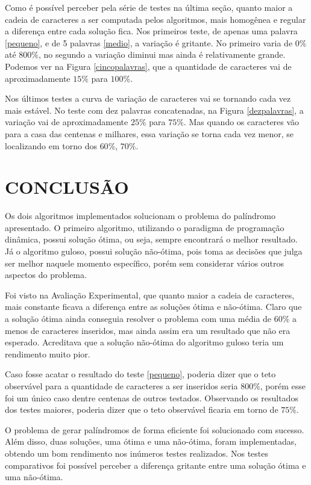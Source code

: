 \documentclass[12pt]{article}
\begin{document}
	Como é possível perceber pela série de testes na última seção, quanto maior a cadeia de caracteres a ser computada pelos algoritmos, mais homogênea e regular a diferença entre cada solução fica. Nos primeiros teste, de apenas uma palavra \ref{pequeno}, e de 5 palavras \ref{medio}, a variação é gritante. No primeiro varia de $0\%$ até $800\%$, no segundo a variação diminui mas ainda é relativamente grande. Podemos ver na Figura \ref{cincopalavras}, que a quantidade de caracteres vai de aproximadamente $15\%$ para $100\%$.

	Nos últimos testes a curva de variação de caracteres vai se tornando cada vez mais estável. No teste com dez palavras concatenadas, na Figura \ref{dezpalavras}, a variação vai de aproximadamente $25\%$ para $75\%$. Mas quando os caracteres vão para a casa das centenas e milhares, essa variação se torna cada vez menor, se localizando em torno dos $60\%$, $70\%$.


\section{CONCLUSÃO}
\label{conclusao}

    Os dois algoritmos implementados solucionam o problema do palíndromo apresentado. O primeiro algoritmo, utilizando o paradigma de programação dinâmica, possui solução ótima, ou seja, sempre encontrará o melhor resultado. Já o algoritmo guloso, possui solução não-ótima, pois toma as decisões que julga ser melhor naquele momento específico, porém sem considerar vários outros aspectos do problema.

    Foi visto na Avaliação Experimental, que quanto maior a cadeia de caracteres, mais constante ficava a diferença entre as soluções ótima e não-ótima. Claro que a solução ótima ainda conseguia resolver o problema com uma média de $60\%$ a menos de caracteres inseridos, mas ainda assim era um resultado que não era esperado. Acreditava que a solução não-ótima do algoritmo guloso teria um rendimento muito pior.

    Caso fosse acatar o resultado do teste \ref{pequeno}, poderia dizer que o teto observável para a quantidade de caracteres a ser inseridos seria $800\%$, porém esse foi um único caso dentre centenas de outros testados. Observando os resultados dos testes maiores, poderia dizer que o teto observável ficaria em torno de $75\%$.

    O problema de gerar palíndromos de forma eficiente foi solucionado com sucesso. Além disso, duas soluções, uma ótima e uma não-ótima, foram implementadas, obtendo um bom rendimento nos inúmeros testes realizados. Nos testes comparativos foi possível perceber a diferença gritante entre uma solução ótima e uma não-ótima.



\end{document}
